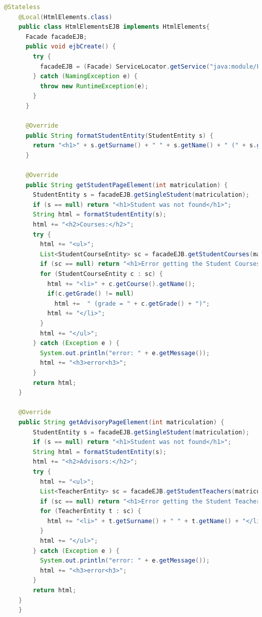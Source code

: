 \documentclass[12pt, a4paper]{article}
\begin{document}
  \begin{lstlisting}[language=java, caption={HtmlElementsEJB}]
    @Stateless
    @Local(HtmlElements.class)
    public class HtmlElementsEJB implements HtmlElements{
      Facade facadeEJB;
      public void ejbCreate() {
        try {
          facadeEJB = (Facade) ServiceLocator.getService("java:module/FacadeEJB!it.marrocco.h2ejbdemo.ejb.Facade");
        } catch (NamingException e) {
          throw new RuntimeException(e);
        }
      }
  
      @Override
      public String formatStudentEntity(StudentEntity s) {
        return "<h1>" + s.getSurname() + " " + s.getName() + " (" + s.getMatriculation() + ")</h1>";
      }
  
      @Override
      public String getStudentPageElement(int matriculation) {
        StudentEntity s = facadeEJB.getSingleStudent(matriculation);
        if (s == null) return "<h1>Student was not found</h1>";
        String html = formatStudentEntity(s);
        html += "<h2>Courses:</h2>";
        try {
          html += "<ul>";
          List<StudentCourseEntity> sc = facadeEJB.getStudentCourses(matriculation);
          if (sc == null) return "<h1>Error getting the Student Courses</h1>";
          for (StudentCourseEntity c : sc) {
            html += "<li>" + c.getCourse().getName();
            if(c.getGrade() != null)
              html +=  " (grade = " + c.getGrade() + ")";
            html += "</li>";
          }
          html += "</ul>";
        } catch (Exception e ) {
          System.out.println("error: " + e.getMessage());
          html += "<h3>error<h3>";
        }
        return html;
    }

    @Override
    public String getAdvisoryPageElement(int matriculation) {
        StudentEntity s = facadeEJB.getSingleStudent(matriculation);
        if (s == null) return "<h1>Student was not found</h1>";
        String html = formatStudentEntity(s);
        html += "<h2>Advisors:</h2>";
        try {
          html += "<ul>";
          List<TeacherEntity> sc = facadeEJB.getStudentTeachers(matriculation);
          if (sc == null) return "<h1>Error getting the Student Teachers</h1>";
          for (TeacherEntity t : sc) {
            html += "<li>" + t.getSurname() + " " + t.getName() + "</li>";
          }
          html += "</ul>";
        } catch (Exception e ) {
          System.out.println("error: " + e.getMessage());
          html += "<h3>error<h3>";
        }
        return html;
    }
    }
  \end{lstlisting}
\end{document}
